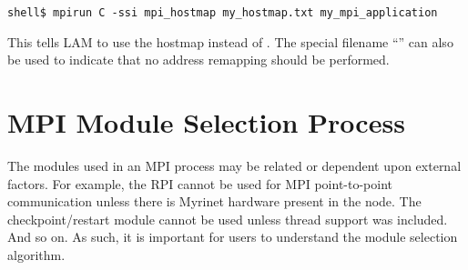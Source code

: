 \lstset{style=lam-cmdline}
\begin{lstlisting}
shell$ mpirun C -ssi mpi_hostmap my_hostmap.txt my_mpi_application
\end{lstlisting}

This tells LAM to use the hostmap  instead of
.  The special filename
``'' can also be used to indicate that no address
remapping should be performed.




\section{MPI Module Selection Process}
\label{sec:mpi-ssi-module-selection}

The modules used in an MPI process may be related or dependent upon
external factors.  For example, the  RPI cannot be used for
MPI point-to-point communication unless there is Myrinet hardware
present in the node.  The  checkpoint/restart module
cannot be used unless thread support was included.  And so on.  As
such, it is important for users to understand the module selection
algorithm.

